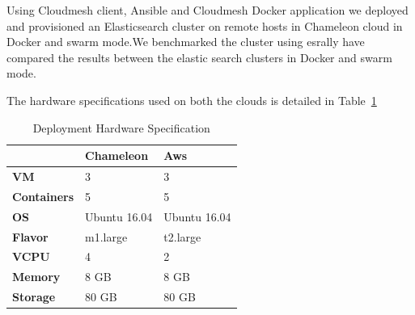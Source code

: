 \documentclass[9pt,twocolumn,twoside]{../../styles/osajnl}
\begin{document}
 Using Cloudmesh  client, Ansible and Cloudmesh Docker application we deployed and provisioned an Elasticsearch cluster on remote hosts in Chameleon cloud in Docker and swarm mode.We benchmarked the cluster using esrally\cite{www-ElasticSearchRally}  have compared the results between the elastic search clusters in Docker and swarm mode.


The hardware specifications used on both the clouds is detailed in Table~\ref{tab:eshardware}

\begin{table}[h]
\centering
\caption{Deployment Hardware Specification}
\label{tab:eshardware}
\begin{tabular}{|l|l|l|}
\hline
 & \textbf{Chameleon} & \textbf{Aws} \\ \hline
\textbf{VM} & 3 & 3 \\
\textbf{Containers} & 5 & 5 \\
\textbf{OS} & Ubuntu 16.04 & Ubuntu 16.04 \\
\textbf{Flavor} & m1.large & t2.large \\
\textbf{VCPU} & 4 & 2 \\
\textbf{Memory} & 8 GB & 8 GB \\
\textbf{Storage} & 80 GB & 80 GB\\
\hline
\end{tabular}
\end{table}
 
\end{document}
